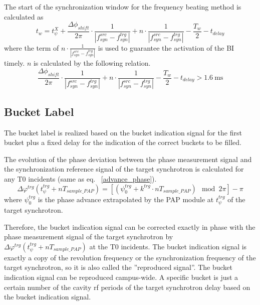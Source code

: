 The start of the synchronization window for the frequency beating method is calculated as
\begin{equation}
t_\mathit{w}= t_\psi^\mathit{X}+\frac{\Delta \phi_\mathit{shift}}{2\pi}\cdot\frac{1}{|f_{\mathit{syn}}^\mathit{src}-f_{\mathit{syn}}^\mathit{trg}|}+n\cdot \frac{1}{|f_{\mathit{syn}}^\mathit{src}-f_{\mathit{syn}}^\mathit{trg}|}-\frac{T_w}{2}-t_\mathit{delay}\label{syn_win_start1}
\end{equation}
where the term of $n\cdot \frac{1}{|f_{\mathit{syn}}^\mathit{src}-f_{\mathit{syn}}^\mathit{trg}|}$ is used to guarantee the activation of the BI timely. $n$ is calculated by the following relation.
\begin{equation}
\frac{\Delta \phi_\mathit{shift}}{2\pi}\cdot\frac{1}{|f_{\mathit{syn}}^\mathit{src}-f_{\mathit{syn}}^\mathit{trg}|}+n\cdot \frac{1}{|f_{\mathit{syn}}^\mathit{src}-f_{\mathit{syn}}^\mathit{trg}|}-\frac{T_w}{2}-t_\mathit{delay}> \SI{1.6}{\ms}
\end{equation}


\subsection{Bucket Label}
\label{sec:bucket_label}
The bucket label is realized based on the bucket indication signal for the first bucket plus a fixed delay for the indication of the correct buckets to be filled. 

The evolution of the phase deviation between the phase measurement signal and the synchronization reference signal of the target synchrotron is calculated for any T0 incidents (same as eq. ~\ref{advance_phase}).
\begin{equation}
\Delta \varphi^\mathit{trg}(t_\mathit{\psi}^\mathit{trg}+nT_\mathit{sample\_PAP})=[(\psi^\mathit{trg}_0+k^\mathit{trg}\cdot nT_\mathit{sample\_PAP}) \mod 2\pi] - \pi
\end{equation}
where $\psi^\mathit{trg}_0$ is the phase advance extrapolated by the PAP module at $t_\mathit{\psi}^\mathit{trg}$ of the target synchrotron.

Therefore, the bucket indication signal can be corrected exactly in phase with the phase measurement signal of the target synchrotron by $\Delta \varphi^\mathit{trg}(t_\mathit{\psi}^\mathit{trg}+nT_\mathit{sample\_PAP})$ at the T0 incidents. The bucket indication signal is exactly a copy of the revolution frequency or the synchronization frequency of the target synchrotron, so
it is also called the ”reproduced signal”. The bucket indication signal can be reproduced campus-wide. A specific bucket is just a certain number of the cavity rf periods of the target synchrotron delay based on the bucket indication signal.


